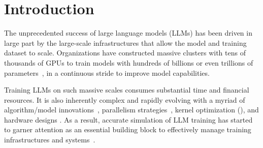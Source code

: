 
\section{Introduction} 
\label{sec:introduction}


The unprecedented success of large language models (LLMs) has been driven in large part by the large-scale infrastructures that allow the model and training dataset to scale. 
Organizations have constructed massive clusters with tens of thousands of GPUs to train models with hundreds of billions or even trillions of parameters~\cite{jiang2024megascale,goyal2017accurate,llama3-meta}, in a continuous stride to improve model capabilities.


Training LLMs on such massive scales consumes substantial time and financial resources. It is also inherently complex and rapidly evolving with a myriad of algorithm/model innovations~\cite{katharopoulos2020transformers,SMMD17}, parallelism strategies~\cite{zhao2023pytorch,ren2021zero,liu2024deepseek}, kernel optimization (\cite{SBZT24,dao2022flashattention}), and hardware designs \cite{memryx}. 
As a result, accurate simulation of LLM training has started to garner attention as an essential building block to effectively manage training infrastructures and systems~\cite{SimAI2025NSDI,duan2024proteus,won2023astra,lu2023distsim,hu2022dpro}. 

